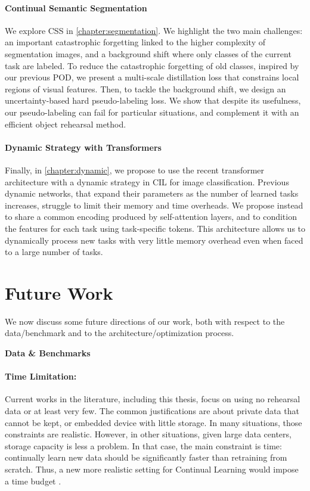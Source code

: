 \paragraph{Continual Semantic Segmentation} We explore \ac{CSS} in \autoref{chapter:segmentation}.
We highlight the two main challenges: an important catastrophic forgetting linked to the higher
complexity of segmentation images, and a background shift where only classes of the current task are
labeled. To reduce the catastrophic forgetting of old classes, inspired by our previous POD, we
present a multi-scale distillation loss that constrains local regions of visual features. Then, to
tackle the background shift, we design an uncertainty-based hard pseudo-labeling loss. We show that
despite its usefulness, our pseudo-labeling can fail for particular situations, and complement it
with an efficient object rehearsal method.

\paragraph{Dynamic Strategy with Transformers} Finally, in \autoref{chapter:dynamic}, we propose to
use the recent transformer architecture with a dynamic strategy in \acf{CIL} for image
classification. Previous dynamic networks, that expand their parameters as the number of learned
tasks increases, struggle to limit their memory and time overheads. We propose instead to share a
common encoding produced by self-attention layers, and to condition the features for each task using
task-specific tokens. This architecture allows us to dynamically process new tasks with very little
memory overhead even when faced to a large number of tasks.

\section{Future Work}

We now discuss some future directions of our work, both with respect to the data/benchmark and to
the architecture/optimization process.

\vspace{2em}
\noindent\large{\textbf{Data \& Benchmarks}}

\paragraph{Time Limitation:} Current works in the literature, including this thesis, focus on using
no rehearsal data or at least very few. The common justifications are about private data that cannot
be kept, or embedded device with little storage. In many situations, those constraints are
realistic. However, in other situations, given large data centers, storage capacity is less a
problem. In that case, the main constraint is time: continually learn new data should be
significantly faster than retraining from scratch. Thus, a new more realistic setting for Continual
Learning would impose a time budget \citep{veniat2018budgetedlearning}.

